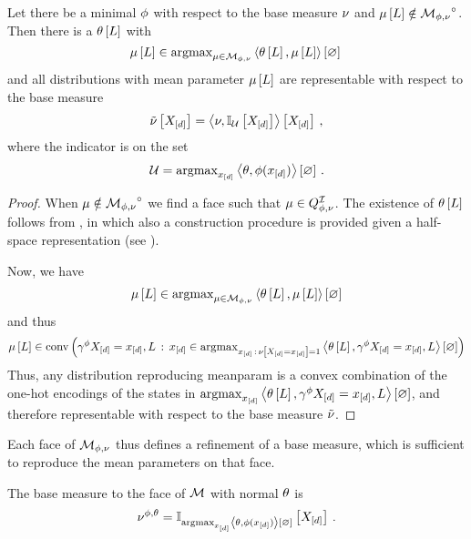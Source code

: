 \begin{theorem}\label{the:faceToArgmax}
	Let there be a minimal $\phi$ with respect to the base measure $\nu$ and $\mu\left[L\right]\notin{\mathcal{M}_{\phi,\nu}}^{\circ}$.
	Then there is a $\theta\left[L\right]$ with 
		\[ \mu\left[L\right] \in \mathrm{argmax}_{\mu\in\mathcal{M}_{\phi,\nu}} \left\langle \theta\left[L\right],\mu\left[L\right]\right\rangle \left[ \varnothing \right] \,  \]
	and all distributions with mean parameter $\mu\left[L\right]$ are representable with respect to the base measure
		\[\tilde{\nu}\left[X_{[d]}\right] = \left\langle \nu, \mathbb{I}_{\mathcal{U}}\left[X_{[d]}\right]\right\rangle \left[ X_{[d]} \right] \, , \]
	where the indicator is on the set
		\[ \mathcal{U} = \mathrm{argmax}_{x_{[d]}} \left\langle \theta,\phi(x_{[d]})\right\rangle \left[ \varnothing \right]  \, . \]
\end{theorem}
\begin{proof}
	When $\mu\notin{\mathcal{M}_{\phi,\nu}}^{\circ}$ we find a face such that $\mu\in Q^{\mathcal{I}}_{\phi,\nu}$.
	The existence of $\theta\left[L\right]$ follows from , in which also a construction procedure is provided given a half-space representation (see ).
	
	Now, we have 
	\begin{align*}
		 \mu\left[L\right] \in \mathrm{argmax}_{\mu\in\mathcal{M}_{\phi,\nu}} \left\langle \theta\left[L\right],\mu\left[L\right]\right\rangle \left[ \varnothing \right] 
	\end{align*}
	and thus 
	\begin{align*}
		 \mu\left[L\right] \in \mathrm{conv}\left( \gamma^{\phi}{X_{[d]}=x_{[d]},L} \, : \, 
		 x_{[d]} \in \mathrm{argmax}_{x_{[d]} \, : \, \nu\left[X_{[d]}=x_{[d]}\right]=1} \left\langle \theta\left[L\right],\gamma^{\phi}{X_{[d]}=x_{[d]},L}\right\rangle \left[ \varnothing \right] \right)
	\end{align*}	
	Thus, any distribution reproducing meanparam is a convex combination of the one-hot encodings of the states in $\mathrm{argmax}_{x_{[d]}} \left\langle \theta\left[L\right],\gamma^{\phi}{X_{[d]}=x_{[d]},L}\right\rangle \left[ \varnothing \right]$, and therefore representable with respect to the base measure $\tilde{\nu}$.
\end{proof}

Each face of $\mathcal{M}_{\phi,\nu}$ thus defines a refinement of a base measure, which is sufficient to reproduce the mean parameters on that face.

\begin{definition}\label{def:faceBaseMeasure}
	The base measure to the face of $\mathcal{M}$ with normal $\theta$ is
		\[ \nu^{\phi,\theta} = \mathbb{I}_{\mathrm{argmax}_{x_{[d]}} \left\langle \theta,\phi(x_{[d]})\right\rangle \left[ \varnothing \right]}\left[X_{[d]}\right] \, . \]
\end{definition}

